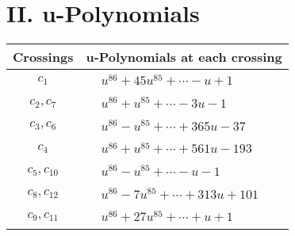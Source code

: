 \documentclass[1p]{elsarticle_modified}
\theoremstyle{definition}
\begin{document}
\newpage\renewcommand{\arraystretch}{1}
\centering \section*{ II. u-Polynomials}
\begin{tabular}{m{50pt}|m{274pt}}
Crossings & \hspace{64pt}u-Polynomials at each crossing \\
\hline $$\begin{aligned}c_{1}\end{aligned}$$&$\begin{aligned}
&u^{86}+45 u^{85}+\cdots- u+1
\end{aligned}$\\
\hline $$\begin{aligned}c_{2},c_{7}\end{aligned}$$&$\begin{aligned}
&u^{86}+u^{85}+\cdots-3 u-1
\end{aligned}$\\
\hline $$\begin{aligned}c_{3},c_{6}\end{aligned}$$&$\begin{aligned}
&u^{86}- u^{85}+\cdots+365 u-37
\end{aligned}$\\
\hline $$\begin{aligned}c_{4}\end{aligned}$$&$\begin{aligned}
&u^{86}+u^{85}+\cdots+561 u-193
\end{aligned}$\\
\hline $$\begin{aligned}c_{5},c_{10}\end{aligned}$$&$\begin{aligned}
&u^{86}- u^{85}+\cdots- u-1
\end{aligned}$\\
\hline $$\begin{aligned}c_{8},c_{12}\end{aligned}$$&$\begin{aligned}
&u^{86}-7 u^{85}+\cdots+313 u+101
\end{aligned}$\\
\hline $$\begin{aligned}c_{9},c_{11}\end{aligned}$$&$\begin{aligned}
&u^{86}+27 u^{85}+\cdots+u+1
\end{aligned}$\\
\hline
\end{tabular}\newpage\renewcommand{\arraystretch}{1}
\end{document}
